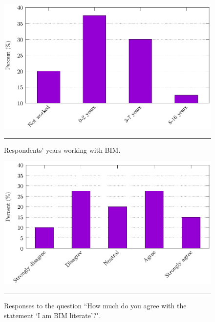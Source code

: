 \begin{figure}[htbp]
	\centering
	\includegraphics[width=\textwidth]{figures/BIM_yrs.eps}
	\rule{\textwidth}{0.5pt} %
	\caption{Respondents' years working with BIM.}
	\label{bim_yrs}
\end{figure}


\begin{figure}[htbp]
	\centering
	\includegraphics[width=\textwidth]{figures/BIM-literacy.eps}
	\rule{\textwidth}{0.5pt} %
	\caption[Respondents' BIM literacy.]{Responses to the question ``How much do you agree with the statement `I am BIM literate'?".}
	\label{bim_literacy}
\end{figure}




